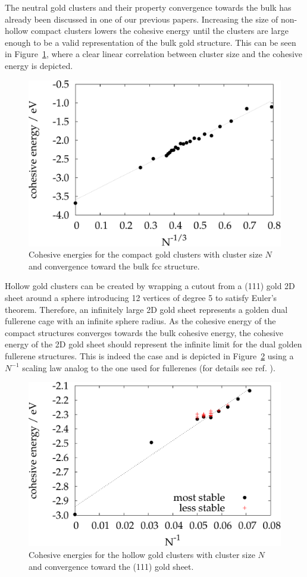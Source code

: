 The neutral gold clusters and their property convergence towards the bulk has
already been discussed in one of our previous
papers.\autocite{Assadollahzadeh_systematicsearchminimum_2009} Increasing the
size of non-hollow compact clusters lowers the cohesive energy until the
clusters are large enough to be a valid representation of the bulk gold
structure.  This can be seen in Figure~\ref{fig:cohesiveenergies1}, where a
clear linear correlation between cluster size and the cohesive energy is
depicted.
%
\begin{figure}\centering
	\includegraphics[width=.8\textwidth]{golddual/cohesive.pdf}
	\caption{Cohesive energies for the compact gold clusters with cluster size $N$ and convergence toward the bulk fcc structure.}
	\label{fig:cohesiveenergies1}
\end{figure}
%
Hollow gold clusters can be created by wrapping a cutout from a (111) gold 2D
sheet around a sphere introducing 12 vertices of degree 5 to satisfy Euler's
theorem.  Therefore, an infinitely large 2D gold sheet represents a golden dual
fullerene cage with an infinite sphere radius. As the cohesive energy of the
compact structures converges towards the bulk cohesive energy, the cohesive
energy of the 2D gold sheet should represent the infinite limit for the dual
golden fullerene structures. This is indeed the case and is depicted in
Figure~\ref{fig:cohesiveenergies2} using a $N^{-1}$ scaling law analog to the
one used for fullerenes (for details see
ref. \cite{Wirz_smallfullerenesgraphene_2015}). 

\begin{figure}\centering
	\includegraphics[width=.8\textwidth]{golddual/cohesive2.pdf}
	\caption{Cohesive energies for the hollow gold clusters with cluster size $N$ and convergence toward the (111) gold sheet.}
	\label{fig:cohesiveenergies2}
\end{figure}

